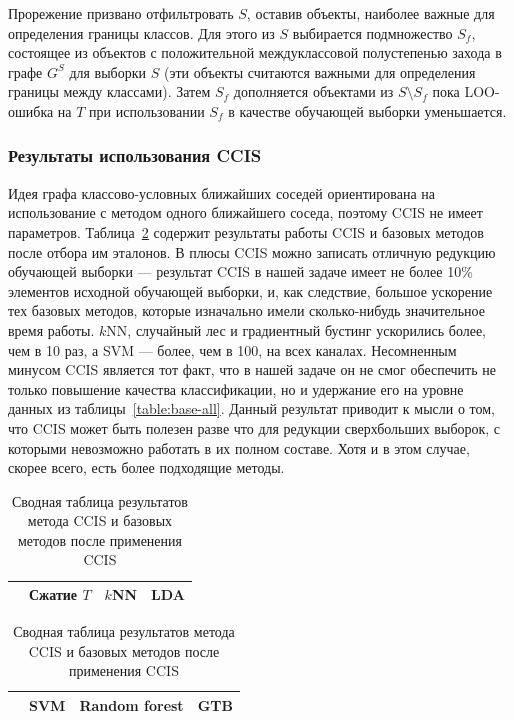 Прорежение призвано отфильтровать \(S\), оставив объекты, наиболее важные для определения границы классов. Для этого из \(S\) выбирается подмножество \(S_f\), состоящее из объектов с положительной междуклассовой полустепенью захода в графе \(G^S\) для выборки \(S\) (эти объекты считаются важными для определения границы между классами). Затем \(S_f\) дополняется объектами из \(S\setminus S_f\) пока LOO-ошибка на \(T\) при использовании \(S_f\) в качестве обучающей выборки уменьшается.

\subsubsection*{Результаты использования CCIS}
Идея графа классово-условных ближайших соседей ориентирована на использование с методом одного ближайшего соседа, поэтому CCIS не имеет параметров. Таблица~\ref{table:ccis-results} содержит результаты работы CCIS и базовых методов после отбора им эталонов. В плюсы CCIS можно записать отличную редукцию обучающей выборки --- результат CCIS в нашей задаче имеет не более 10\% элементов исходной обучающей выборки, и, как следствие, большое ускорение тех базовых методов, которые изначально имели сколько-нибудь значительное время работы. \(k\)NN, случайный лес и градиентный бустинг ускорились более, чем в 10 раз, а SVM --- более, чем в 100, на всех каналах. Несомненным минусом CCIS является тот факт, что в нашей задаче он не смог обеспечить не только повышение качества классификации, но и удержание его на уровне данных из таблицы~\ref{table:base-all}. Данный результат приводит к мысли о том, что CCIS может быть полезен разве что для редукции сверхбольших выборок, с которыми невозможно работать в их полном составе. Хотя и в этом случае, скорее всего, есть более подходящие методы.

\begin{table}[h!]
    \centering
    \begin{tabular}{|c||c||c|c|}
    \cline{2-4}
    \multicolumn{1}{c||}{} & Сжатие \(T\) & \(k\)NN & LDA \\
    \hline \hline
	
\end{tabular}
\newline \vspace*{0.5cm} \newline
\begin{tabular}{|c||c|c|c|}
    \cline{2-4}
    \multicolumn{1}{c||}{} & SVM & Random forest & GTB \\
    \hline \hline
	
    \end{tabular}
    \caption{Сводная таблица результатов метода CCIS и базовых методов после применения CCIS}
    \label{table:ccis-results}
\end{table}

